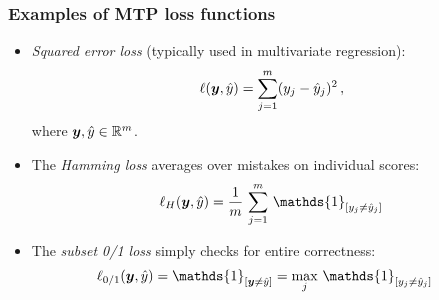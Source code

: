\begin{frame}
	\frametitle{Examples of MTP loss functions}
	\begin{itemize}
		
		\small 
		\item \emph{Squared error loss} (typically used in multivariate regression):
		$$
		\ell(\bm{y}, \hat{y}) = \sum_{j=1}^m (y_j - \hat{y}_j)^2 \, ,
		$$
		where $\bm{y} , \hat{y} \in \mathbb{R}^m$.
		
		
		\medskip
		
		
		
		
		\item The \emph{Hamming loss} averages over mistakes on individual scores:    
		$$
		\displaystyle \ell_H(\yv, \hat{y}) = \frac{1}{m}  \, \sum_{j=1}^m \, \mathds{1}_{[y_j \neq  \hat y_j ]}
		$$
		
		\item The \emph{subset 0/1 loss} simply checks for entire correctness:  
		\begin{align*}
			\displaystyle \ell_{0/1}(\yv, \hat{y}) & = \mathds{1}_{[ \yv \ne \hat{y} ]}  =  \max_j \, \mathds{1}_{[y_j \neq  \hat y_j]}
		\end{align*}
		
		
	\end{itemize}
\end{frame}



